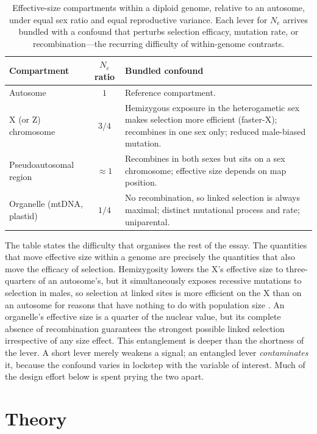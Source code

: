 \documentclass[11pt,a4paper]{article}
\newcommand{\Ne}{N_{e}}
\begin{document}
\begin{table}[h!]
\centering
\small
\caption{Effective-size compartments within a diploid genome, relative to an autosome, under equal sex ratio and equal reproductive variance. Each lever for $\Ne$ arrives bundled with a confound that perturbs selection efficacy, mutation rate, or recombination---the recurring difficulty of within-genome contrasts.}
\label{tab:compartments}
\begin{tabular}{p{3.2cm} c p{8.2cm}}
\toprule
\textbf{Compartment} & \textbf{$\Ne$ ratio} & \textbf{Bundled confound} \\
\midrule
Autosome & $1$ & Reference compartment. \\
\addlinespace
X (or Z) chromosome & $3/4$ & Hemizygous exposure in the heterogametic sex makes selection more efficient (faster-X); recombines in one sex only; reduced male-biased mutation. \\
\addlinespace
Pseudoautosomal region & $\approx 1$ & Recombines in both sexes but sits on a sex chromosome; effective size depends on map position. \\
\addlinespace
Organelle (mtDNA, plastid) & $1/4$ & No recombination, so linked selection is always maximal; distinct mutational process and rate; uniparental. \\
\bottomrule
\end{tabular}
\end{table}

The table states the difficulty that organises the rest of the essay. The quantities that move effective size within a genome are precisely the quantities that also move the efficacy of selection. Hemizygosity lowers the X's effective size to three-quarters of an autosome's, but it simultaneously exposes recessive mutations to selection in males, so selection at linked sites is more efficient on the X than on an autosome for reasons that have nothing to do with population size \citep{ccc1987,vicoso2006}. An organelle's effective size is a quarter of the nuclear value, but its complete absence of recombination guarantees the strongest possible linked selection irrespective of any size effect. This entanglement is deeper than the shortness of the lever. A short lever merely weakens a signal; an entangled lever \emph{contaminates} it, because the confound varies in lockstep with the variable of interest. Much of the design effort below is spent prying the two apart.

\section{Theory}
\end{document}
